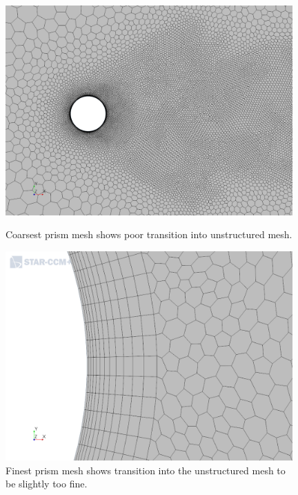 \documentclass[10pt,english]{article}
\begin{document}
\begin{figure}[h]
\centering
\begin{minipage}{.49\textwidth}
  \centering
\includegraphics[trim={2.0cm 0cm 2.5cm .5cm},clip,width=0.98\textwidth]{cylinder_2_016_MeshScene2_2.png}
\caption{Coarsest prism mesh shows poor transition into unstructured mesh.}
\label{f:cylinder_2_016_MeshScene2_2}
\end{minipage}%
\hspace{5pt}
\begin{minipage}{.49\textwidth}
  \centering
\includegraphics[trim={2.0cm 0cm 2.5cm .5cm},clip,width=0.98\textwidth]{cylinder_2_016_MeshScene2_3.png}
\caption{\vspace{0pt}Finest prism mesh shows transition into the unstructured mesh to be slightly too fine.}
\label{f:cylinder_2_016_MeshScene2_3}
\end{minipage}
\end{figure}
\end{document}
